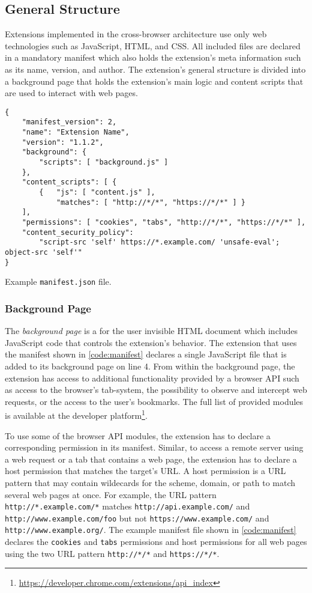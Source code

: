 \subsection{General Structure}

	Extensions implemented in the cross-browser architecture use only web technologies such as JavaScript, HTML, and CSS. All included files are declared in a mandatory manifest which also holds the extension's meta information such as its name, version, and author. The extension's general structure is divided into a background page that holds the extension's main logic and content scripts that are used to interact with web pages.
	
	\begin{code}
		\begin{lstlisting}
{
	"manifest_version": 2,
	"name": "Extension Name",
	"version": "1.1.2",
	"background": {
		"scripts": [ "background.js" ]
	},
	"content_scripts": [ {
		{ 	"js": [ "content.js" ],
			"matches": [ "http://*/*", "https://*/*" ] }
	],
	"permissions": [ "cookies", "tabs", "http://*/*", "https://*/*" ],
	"content_security_policy": 
		"script-src 'self' https://*.example.com/ 'unsafe-eval'; object-src 'self'"
}
\end{lstlisting}
		\caption{Example \texttt{manifest.json} file.}
		\label{code:manifest}
	\end{code}
	
\subsubsection{Background Page}

	The \textit{background page} is a for the user invisible HTML document which includes JavaScript code that controls the extension's behavior. The extension that uses the manifest shown in \autoref{code:manifest} declares a single JavaScript file that is added to its background page on line 4. From within the background page, the extension has access to additional functionality provided by a browser API such as access to the browser's tab-system, the possibility to observe and intercept web requests, or the access to the user's bookmarks. The full list of provided modules is available at the developer platform\footnote{\url{https://developer.chrome.com/extensions/api_index}}. 
	
	To use some of the browser API modules, the extension has to declare a corresponding permission in its manifest. Similar, to access a remote server using a web request or a tab that contains a web page, the extension has to declare a host permission that matches the target's URL. A host permission is a URL pattern that may contain wildecards for the scheme, domain, or path to match several web pages at once. For example, the URL pattern \texttt{http://*.example.com/*} matches \texttt{http://api.example.com/} and \texttt{http://www.example.com/foo} but not \texttt{https://www.example.com/} and \texttt{http://www.example.org/}. The example manifest file shown in \autoref{code:manifest} declares the \texttt{cookies} and \texttt{tabs} permissions and host permissions for all web pages using the two URL pattern \texttt{http://*/*} and \texttt{https://*/*}.	
	
